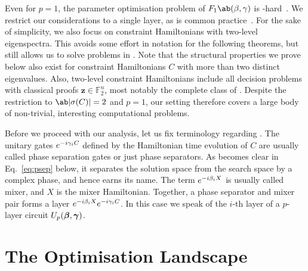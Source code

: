 Even for $p=1$, the parameter optimisation problem of $F_1 \ab(\mangle, \pangle)$ is \NP-hard~\cite{bittel_training_2021}. We restrict our considerations to a single layer, as is common practice~\cite{farhi2014quantum,bravyi2020obstacles,galda2similarity,blekos_review_2024,fernandez-pendas_study_2022,lotshaw_empirical_2021,Jain:2022,sack2021quantum,Egger:2021,Vijendran:2024,Hadfield:2019}. For the sake of simplicity, we also focus on constraint Hamiltonians with two-level eigenspectra. This avoids some effort in notation for the following 
theorems, but still allows us to solve problems in \NP. Note that the structural properties we prove below also exist for constraint Hamiltonians $C$ with more than two distinct eigenvalues. Also, two-level constraint Hamiltonians include all decision problems with classical proofs $\bm{z} \in \mathds{F}_2^n$, most notably the complete class of \NP. Despite the restriction to $\ab|\sigma(C)| = 2$ and \(p=1\), our 
setting therefore covers a large body of non-trivial, interesting computational 
problems. 

Before we proceed with our analysis, let us fix terminology
regarding \QAOA. The unitary gates $e^{-i \gamma_i C}$ defined by the Hamiltonian time evolution of $C$ are usually called phase separation gates or just phase separators.  As becomes clear in Eq.~\ref{eq:psep} 
below, it separates the solution space from the search space by a 
complex phase, and hence earns its name.
The term $e^{-i \beta_i X}$ is usually called mixer, and $X$ is
the mixer Hamiltonian. Together, a phase separator and mixer pair forms a layer $e^{-i \beta_i X} e^{-i \gamma_i C}$. In this case we speak of the $i$-th layer of a $p$-layer \QAOA circuit $U_p(\bm{\beta}, \bm{\gamma})$.


\section{The Optimisation Landscape}\label{sec:opt_landscape}

